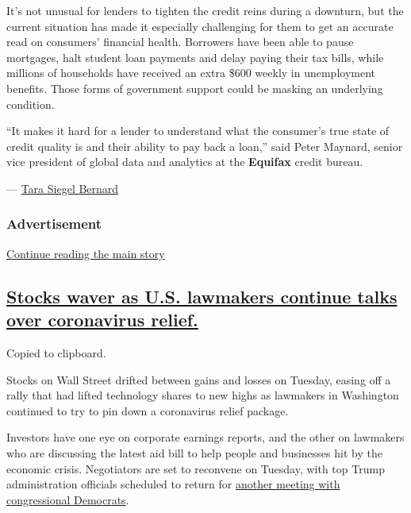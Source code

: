 It's not unusual for lenders to tighten the credit reins during a
downturn, but the current situation has made it especially challenging
for them to get an accurate read on consumers' financial health.
Borrowers have been able to pause mortgages, halt student loan payments
and delay paying their tax bills, while millions of households have
received an extra \$600 weekly in unemployment benefits. Those forms of
government support could be masking an underlying condition.

``It makes it hard for a lender to understand what the consumer's true
state of credit quality is and their ability to pay back a loan,'' said
Peter Maynard, senior vice president of global data and analytics at the
\textbf{Equifax} credit bureau.

--- \href{https://www.nytimes.com/by/tara-siegel-bernard}{Tara Siegel
Bernard}

\hypertarget{advertisement-1}{%
\subsubsection{Advertisement}\label{advertisement-1}}

\protect\hyperlink{after-dfp-ad-mid2}{Continue reading the main story}

\hypertarget{stocks-waver-as-us-lawmakers-continue-talks-over-coronavirus-relief}{%
\subsection{\texorpdfstring{\protect\hyperlink{stocks-waver-as-us-lawmakers-continue-talks-over-coronavirus-relief}{Stocks
waver as U.S. lawmakers continue talks over coronavirus
relief.}}{Stocks waver as U.S. lawmakers continue talks over coronavirus relief.}}\label{stocks-waver-as-us-lawmakers-continue-talks-over-coronavirus-relief}}

Copied to clipboard.

Stocks on Wall Street drifted between gains and losses on Tuesday,
easing off a rally that had lifted technology shares to new highs as
lawmakers in Washington continued to try to pin down a coronavirus
relief package.

Investors have one eye on corporate earnings reports, and the other on
lawmakers who are discussing the latest aid bill to help people and
businesses hit by the economic crisis. Negotiators are set to reconvene
on Tuesday, with top Trump administration officials scheduled to return
for
\href{https://www.nytimes.com/2020/08/02/us/politics/coronavirus-jobless-aid.html}{another
meeting with congressional Democrats}.

